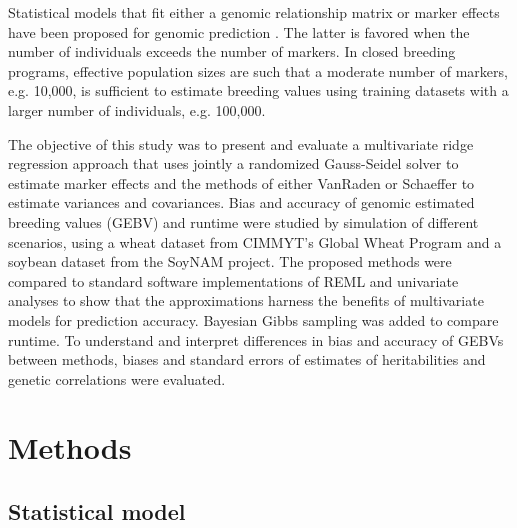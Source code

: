 \documentclass{bmcart}
\begin{document}
Statistical models that fit either a genomic relationship matrix or marker effects have been proposed for genomic prediction \cite{WGR2013}. The latter is favored when the number of individuals exceeds the number of markers. In closed breeding programs, effective population sizes are such that a moderate number of markers, e.g. 10,000, is sufficient to estimate breeding values using training datasets with a larger number of individuals, e.g. 100,000.


The objective of this study was to present and evaluate a multivariate ridge regression approach that uses jointly a randomized Gauss-Seidel solver to estimate marker effects and the methods of either VanRaden \cite{VanRaden} or Schaeffer \cite{Schaeffer} to estimate variances and covariances. Bias and accuracy of genomic estimated breeding values (GEBV) and runtime were studied by simulation of different scenarios, using a wheat dataset from CIMMYT's Global Wheat Program and a soybean dataset from the SoyNAM project. The proposed methods were compared to standard software implementations of REML and univariate analyses to show that the approximations harness the benefits of multivariate models for prediction accuracy. Bayesian Gibbs sampling was added to compare runtime. To understand and interpret differences in bias and accuracy of GEBVs between methods, biases and standard errors of estimates of heritabilities and genetic correlations were evaluated. 

\section{Methods}

\subsection{Statistical model\label{StatModel}}
\end{document}
